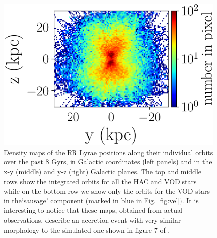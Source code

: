 \documentclass[fleqn,usenatbib]{mnras}
\begin{document}
\begin{figure}
             \includegraphics[scale=0.302]{VOD_orbits_8Gyrs_yz_sausage.pdf}
\vspace{-0.45cm}
   \caption{Density maps of the RR Lyrae positions along their individual orbits over the past 8 Gyrs, in Galactic coordinates (left panels) and in the x-y (middle) and y-z (right) Galactic planes.  The top and middle rows show the integrated orbits for all the HAC and VOD stars while on the bottom row we show only the orbits for the VOD stars in the`sausage' component (marked in blue in Fig. \ref{fig:vel}). It is interesting to notice that these maps, obtained from actual observations, describe an accretion event with very similar morphology to the simulated one shown in figure 7 of \citet{Simion2018}.}
    \label{fig:backorbits}
\end{figure}
%
%
\end{document}
